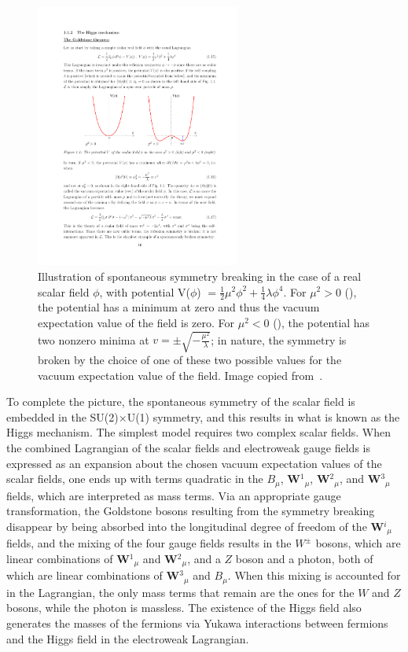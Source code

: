 \begin{figure}
   \begin{center}
      \includegraphics[width=0.6\textwidth]{figures/intro-Higgspotential}
      \caption{Illustration of spontaneous symmetry breaking in the case of a real scalar field $\phi$, with potential V($\phi$) $= \frac{1}{2}\mu^2\phi^2 + \frac{1}{4}\lambda\phi^4$. For $\mu^2 > 0$ (\cmsLeft), the potential has a minimum at zero and thus the vacuum expectation value of the field is zero. For $\mu^2 < 0$ (\cmsRight), the potential has two nonzero minima at $v = \pm\sqrt{-\frac{\mu^2}{\lambda}}$; in nature, the symmetry is broken by the choice of one of these two possible values for the vacuum expectation value of the field. Image copied from~\cite{Djouadi:2005gi}.}
      \label{fig:higgspotential}
   \end{center}
\end{figure}

To complete the picture, the spontaneous symmetry of the scalar field is embedded in the SU(2)$\times$U(1) symmetry, and this results in what is known as the Higgs mechanism. The simplest model requires two complex scalar fields. When the combined Lagrangian of the scalar fields and electroweak gauge fields is expressed as an expansion about the chosen vacuum expectation values of the scalar fields, one ends up with terms quadratic in the $B_{\mu}$, \textbf{W}$^1$$_{\mu}$, \textbf{W}$^2$$_{\mu}$, and \textbf{W}$^3$$_{\mu}$ fields, which are interpreted as mass terms. Via an appropriate gauge transformation, the Goldstone bosons resulting from the symmetry breaking disappear by being absorbed into the longitudinal degree of freedom of the \textbf{W}$^i$$_{\mu}$ fields, and the mixing of the four gauge fields results in the $W^{\pm}$ bosons, which are linear combinations of \textbf{W}$^1$$_{\mu}$ and \textbf{W}$^2$$_{\mu}$, and a $Z$ boson and a photon, both of which are linear combinations of \textbf{W}$^3$$_{\mu}$ and $B_{\mu}$. When this mixing is accounted for in the Lagrangian, the only mass terms that remain are the ones for the $W$ and $Z$ bosons, while the photon is massless. The existence of the Higgs field also generates the masses of the fermions via Yukawa interactions between fermions and the Higgs field in the electroweak Lagrangian.

